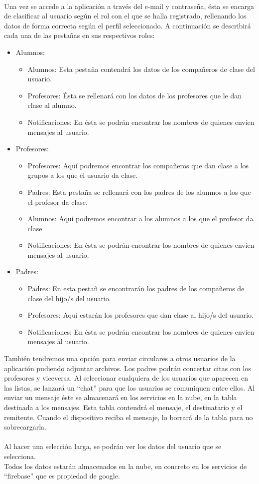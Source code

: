 \\
Una vez se accede a la aplicación a través del e-mail y contraseña, ésta se encarga de clasificar al usuario según el rol con el que se halla registrado, rellenando los datos de forma correcta según el perfil seleccionado. A continuación se describirá cada una de las pestañas en sus respectivos roles:
\\
\begin{itemize}
	\item Alumnos:
	\begin{itemize}
		\item Alumnos: Esta pestaña contendrá los datos de los compañeros de clase del usuario.
		\item Profesores: Ésta se rellenará con los datos de los profesores que le dan clase al alumno.
		\item Notificaciones: En ésta se podrán encontrar los nombres de quienes envíen mensajes al usuario.
	\end{itemize}
	\item Profesores:
	\begin{itemize}
		\item Profesores: Aquí podremos encontrar los compañeros que dan clase a los grupos a los que el usuario da clase.
		\item Padres: Esta pestaña se rellenará con los padres de los alumnos a los que el profesor da clase.
		\item Alumnos: Aquí podremos encontrar a los alumnos a los que el profesor da clase
		\item Notificaciones: En ésta se podrán encontrar los nombres de quienes envíen mensajes al usuario.
	\end{itemize}
	\item Padres:
	\begin{itemize}
		\item Padres: En esta pestañ se encontrarán los padres de los compañeros de clase del hijo/s del usuario.
		\item Profesores: Aquí estarán los profesores que dan clase al hijo/s del usuario.
		\item Notificaciones: En ésta se podrán encontrar los nombres de quienes envíen mensajes al usuario.
	\end{itemize}
\end{itemize}

También tendremos una opción para enviar circulares a otros usuarios de la aplicación pudiendo adjuntar archivos. Los padres podrán concertar citas con los profesores y viceversa.
Al seleccionar cualquiera de los usuarios que aparecen en las listas, se lanzará un ``chat'' para que los usuarios se comuniquen entre ellos. Al enviar un mensaje éste se almacenará en los servicios en la nube, en la tabla destinada a los mensajes. Esta tabla contendrá el mensaje, el destinatario y el remitente. Cuando el dispositivo reciba el mensaje, lo borrará de la tabla para no sobrecargarla.\\
\\
Al hacer una selección larga, se podrán ver los datos del usuario que se selecciona.
\\
Todos los datos estarán almacenados en la nube, en concreto en los servicios de ``firebase'' que es propiedad de google.

